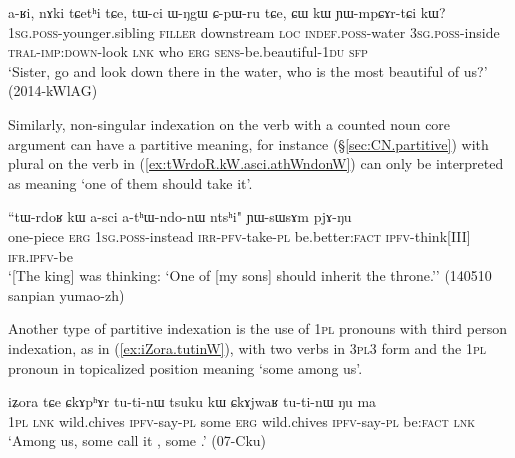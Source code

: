 \begin{exe}
\ex   \label{ex:CW.kW.YWmpCArtCi}
 \gll  a-ʁi, nɤki tɕetʰi tɕe, tɯ-ci ɯ-ŋgɯ ɕ-pɯ-ru tɕe, ɕɯ kɯ ɲɯ-mpɕɤr-tɕi kɯ? \\
 \textsc{1sg}.\textsc{poss}-younger.sibling \textsc{filler} downstream \textsc{loc} \textsc{indef}.\textsc{poss}-water \textsc{3sg}.\textsc{poss}-inside \textsc{tral}-\textsc{imp}:\textsc{down}-look \textsc{lnk} who \textsc{erg} \textsc{sens}-be.beautiful-\textsc{1du} \textsc{sfp} \\
 \glt `Sister, go and look down there in the water, who is the most beautiful of us?' (2014-kWlAG)
\end{exe} 


Similarly, non-singular indexation on the verb with a counted noun core argument can have a partitive meaning, for instance  (§\ref{sec:CN.partitive}) with plural  on the verb in (\ref{ex:tWrdoR.kW.asci.athWndonW}) can only be interpreted as meaning `one of them should take it'.

\begin{exe}
\ex   \label{ex:tWrdoR.kW.asci.athWndonW}
 \gll ``tɯ-rdoʁ kɯ a-sci a-tʰɯ-ndo-nɯ ntsʰi" ɲɯ-sɯsɤm pjɤ-ŋu \\
one-piece \textsc{erg} \textsc{1sg}.\textsc{poss}-instead \textsc{irr}-\textsc{pfv}-take-\textsc{pl} be.better:\textsc{fact} \textsc{ipfv}-think[III] \textsc{ifr}.\textsc{ipfv}-be \\
\glt `[The king] was thinking: `One of [my sons] should inherit the throne.'' (140510 sanpian yumao-zh)
\end{exe} 

Another type of partitive indexation is the use of \textsc{1pl} pronouns with third person indexation, as in (\ref{ex:iZora.tutinW}), with two verbs in \textsc{3pl}\fl{}3 form and the \textsc{1pl} pronoun in topicalized position meaning `some among us'.

\begin{exe}
\ex   \label{ex:iZora.tutinW}
 \gll  iʑora tɕe ɕkɤpʰɤr tu-ti-nɯ tsuku kɯ ɕkɤjwaʁ tu-ti-nɯ ŋu ma \\
 \textsc{1pl} \textsc{lnk} wild.chives \textsc{ipfv}-say-\textsc{pl} some \textsc{erg}  wild.chives \textsc{ipfv}-say-\textsc{pl} be:\textsc{fact} \textsc{lnk} \\
\glt `Among us, some call it , some .' (07-Cku)
\end{exe} 

